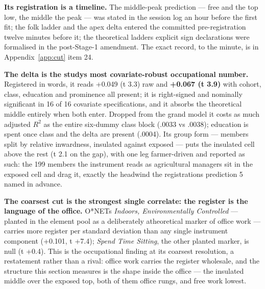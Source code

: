 \textbf{Its registration is a timeline.} The middle-peak prediction --- free and
the top low, the middle the peak --- was stated in the session log an hour
before the first fit; the folk ladder and
the apex delta entered the committed pre-registration twelve minutes before
it; the theoretical ladder\textquotesingle s explicit sign declarations were formalised in
the post-Stage-1 amendment. The exact record, to the minute, is in Appendix~\ref{app:cut} item 24.

\textbf{The delta is the study\textquotesingle s most covariate-robust occupational number.}
Registered in words, it reads +0.049 (t 3.3) raw and \textbf{+0.067 (t 3.9)} with
cohort, class, education and prominence all present; it is right-signed and
nominally significant in 16 of 16 covariate specifications, and it absorbs
the theoretical middle entirely when both enter. Dropped from the grand
model it costs as much adjusted \(R^{2}\) as the entire six-dummy class block
(.0033 vs .0038); education is spent once class and the delta are present
(.0004). Its group form --- members split by relative inwardness, insulated
against exposed --- puts the insulated cell above the rest (t 2.1 on the gap),
with one leg farmer-driven and reported as such: the 199 members the
instrument reads as agricultural managers sit in the exposed cell and drag
it, exactly the headwind the registration\textquotesingle s prediction 5 named in advance.

\textbf{The coarsest cut is the strongest single correlate: the register is the
language of the office.} O*NET\textquotesingle s \emph{Indoors, Environmentally Controlled} ---
planted in the element pool as a deliberately atheoretical marker of office
work --- carries more register per standard deviation than any single
instrument component (+0.101, t +7.4); \emph{Spend Time Sitting}, the other
planted marker, is null (t +0.4). This is the occupational finding at its
coarsest resolution, a restatement rather than a rival: office work carries
the register wholesale, and the structure this section measures is the shape
inside the office --- the insulated middle over the exposed top, both of them
office rungs, and free work lowest.

